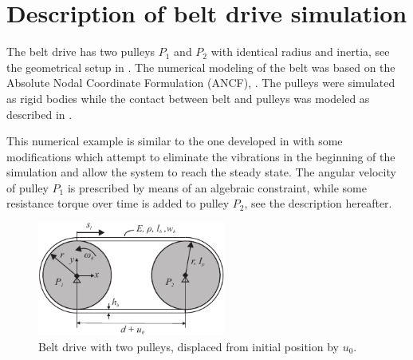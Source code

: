 \section{Description of belt drive simulation}
The belt drive has two pulleys $P_1$ and $P_2$ with identical radius and inertia, see the geometrical setup in .
%
The numerical modeling of the belt was based on the Absolute Nodal Coordinate Formulation (ANCF), \cite{Gerstmayr2008}. The pulleys were simulated as rigid bodies while the contact between belt and pulleys was modeled as described in \cite{Ntarladima2023}.


%
This numerical example is similar to the one developed in \cite{Pechstein2013} with some modifications which attempt to eliminate the vibrations in the beginning of the simulation and allow the system to reach the steady state. The angular velocity of pulley $P_1$ is prescribed by means of an algebraic constraint, while some resistance torque over time is added to pulley $P_2$, see the description hereafter.
\begin{figure}[tbph]
    \centering
    \includegraphics[width=0.55\textwidth]{figures/ESR8_beltPechstein.pdf}
    \caption{Belt drive with two pulleys, displaced from initial position by $u_0$.}
    \label{fig:ESR8_BeltDrive}
\end{figure}
